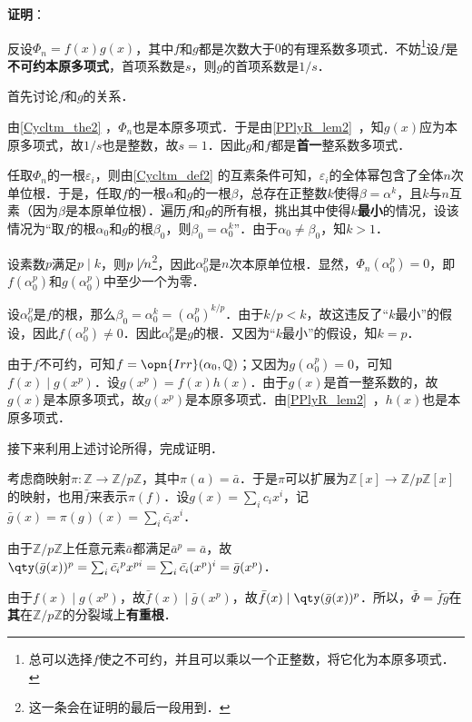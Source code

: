 \textbf{证明}：

反设$\Phi_n=f(x)g(x)$，其中$f$和$g$都是次数大于$0$的有理系数多项式．不妨\footnote{总可以选择$f$使之不可约，并且可以乘以一个正整数，将它化为本原多项式．}设$f$是\textbf{不可约本原多项式}，首项系数是$s$，则$g$的首项系数是$1/s$．

首先讨论$f$和$g$的关系．

由\autoref{Cycltm_the2} ，$\Phi_n$也是本原多项式．于是由\autoref{PPlyR_lem2}~，知$g(x)$应为本原多项式，故$1/s$也是整数，故$s=1$．因此$g$和$f$都是\textbf{首一}整系数多项式．

任取$\Phi_n$的一根$\varepsilon_i$，则由\autoref{Cycltm_def2} 的互素条件可知，$\varepsilon_i$的全体幂包含了全体$n$次单位根．于是，任取$f$的一根$\alpha$和$g$的一根$\beta$，总存在正整数$k$使得$\beta=\alpha^k$，且$k$与$n$互素（因为$\beta$是本原单位根）．遍历$f$和$g$的所有根，挑出其中使得$k$\textbf{最小}的情况，设该情况为“取$f$的根$\alpha_0$和$g$的根$\beta_0$，则$\beta_0=\alpha_0^k$”．由于$\alpha_0\neq \beta_0$，知$k>1$．

设素数$p$满足$p\mid k$，则$p\not\mid n$\footnote{这一条会在证明的最后一段用到．}，因此$\alpha_0^p$是$n$次本原单位根．显然，$\Phi_n(\alpha_0^p)=0$，即$f(\alpha_0^p)$和$g(\alpha_0^p)$中至少一个为零．

设$\alpha_0^p$是$f$的根，那么$\beta_0=\alpha_0^k=(\alpha_0^p)^{k/p}$．由于$k/p<k$，故这违反了“$k$最小”的假设，因此$f(\alpha_0^p)\neq 0$．因此$\alpha_0^p$是$g$的根．又因为“$k$最小”的假设，知$k=p$．

由于$f$不可约，可知$f=\opn{Irr}(\alpha_0, \mathbb{Q})$；又因为$g(\alpha_0^p)=0$，可知$f(x)\mid g(x^p)$．设$g(x^p)=f(x)h(x)$．由于$g(x)$是首一整系数的，故$g(x)$是本原多项式，故$g(x^p)$是本原多项式．由\autoref{PPlyR_lem2}~，$h(x)$也是本原多项式．

接下来利用上述讨论所得，完成证明．

考虑商映射$\pi:\mathbb{Z}\to\mathbb{Z}/p\mathbb{Z}$，其中$\pi(a)=\bar{a}$．于是$\pi$可以扩展为$\mathbb{Z}[x]\to\mathbb{Z}/p\mathbb{Z}[x]$的映射，也用$\bar{f}$来表示$\pi(f)$．设$g(x)=\sum_i c_ix^i$，记$\bar{g}(x)=\pi(g)(x)=\sum_i \bar{c_i}x^i$．

由于$\mathbb{Z}/p\mathbb{Z}$上任意元素$\bar{a}$都满足$\bar{a}^p=\bar{a}$，故$\qty(\bar{g}(x))^p=\sum_i\bar{c_i}^px^{pi}=\sum_i \bar{c_i}(x^p)^i=\bar{g}(x^p)$．

由于$f(x)\mid g(x^p)$，故$\bar{f}(x)\mid \bar{g}(x^p)$，故$\bar{f}(x)\mid \qty(\bar{g}(x))^p$．所以，$\bar{\Phi}=\bar{f}\bar{g}$在\textbf{其}在$\mathbb{Z}/p\mathbb{Z}$的分裂域上\textbf{有重根}．

